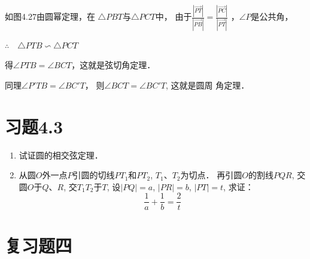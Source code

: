 如图4.27由圆幂定理，在
$\triangle PBT$与$\triangle PCT$中，
由于$\frac{|\Vec{PT}|}{|\Vec{PB}|}=\frac{|\Vec{PC}|}{|\Vec{PT}|}$
，$\angle P$是公共角，

$\therefore\quad \triangle PTB \backsim \triangle PCT$

得$\angle PTB=\angle BCT$，这就是弦切角定理．

同理$\angle P'TB=\angle BC'T$，
则$\angle BCT=\angle BC'T$, 这就是圆周
角定理．


\section*{习题4.3}

\begin{enumerate}
    \item 试证圆的相交弦定理．
    \item 从圆$O$外一点$P$引圆的切线$PT_1$和$PT_2$, $T_1$、$T_2$为切点．
再引圆$O$的割线$PQR$, 交圆$O$于$Q$、$R$, 交$T_1T_2$于$T$, 
设$|PQ|=a$, $|PR|=b$, $|PT|=t$, 求证：
\[\frac{1}{a}+\frac{1}{b}=\frac{2}{t}\]
\end{enumerate}

\section*{复习题四}

